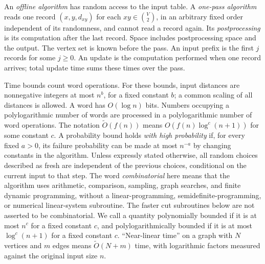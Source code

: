 \documentclass[11pt]{article}
\theoremstyle{definition}
\newcommand{\wt}{\widetilde}
\begin{document}
An \emph{offline algorithm} has random access to the input table.
A \emph{one-pass algorithm} reads one record $(x,y,d_{xy})$ for each
$xy\in\binom V2$, in an arbitrary fixed order independent of its randomness,
and cannot read a record again. Its \emph{postprocessing} is its computation
after the last record. Space includes postprocessing space and the output.
The vertex set is known before the pass. An input prefix is the first
$j$ records for some $j\ge0$. An update is the computation performed
when one record arrives; total update time sums these times over the pass.

Time bounds count word operations. For these bounds, input distances are
nonnegative integers at most $n^b$, for a fixed constant $b$; a common scaling
of all distances is allowed. A word has $O(\log n)$ bits. Numbers occupying
a polylogarithmic number of words are processed in a polylogarithmic number
of word operations. The notation $\wt O(f(n))$ means
$O(f(n)\log^c(n+1))$ for some constant $c$. A probability bound holds
\emph{with high probability} if, for every fixed $a>0$, its failure
probability can be made at most $n^{-a}$ by changing constants in the
algorithm. Unless expressly stated otherwise, all random choices described
as fresh are independent of the previous choices, conditional on the current
input to that step. The word \emph{combinatorial} here means that the
algorithm uses arithmetic, comparison, sampling, graph searches, and finite
dynamic programming, without a linear-programming, semidefinite-programming,
or numerical linear-system subroutine. The faster cut subroutines below are
not asserted to be combinatorial.
We call a quantity polynomially bounded if it is at most $n^c$ for a
fixed constant $c$, and polylogarithmically bounded if it is at most
$\log^c(n+1)$ for a fixed constant $c$. ``Near-linear time'' on a graph
with $N$ vertices and $m$ edges means $\widetilde O(N+m)$ time, with
logarithmic factors measured against the original input size $n$.
\end{document}
